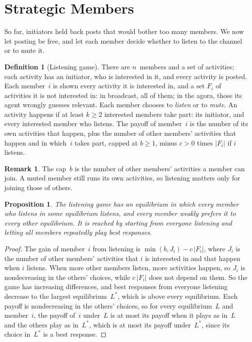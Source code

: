 \documentclass[11pt]{article}
\newtheorem{proposition}{Proposition}
\theoremstyle{definition}
\newtheorem{definition}{Definition}
\newtheorem{remark}{Remark}
\begin{document}
\section{Strategic Members}
So far, initiators held back posts that would bother too many members. We now let posting be free, and let each member decide whether to listen to the channel or to mute it.

\begin{definition}[Listening game]
There are $n$~members and a set of activities; each activity has an initiator, who is interested in it, and every activity is posted. Each member~$i$ is shown every activity it is interested in, and a set $F_i$ of activities it is not interested in: in broadcast, all of them; in the agora, those its agent wrongly guesses relevant. Each member chooses to \emph{listen} or to \emph{mute}. An activity happens if at least $k \ge 2$ interested members take part: its initiator, and every interested member who listens. The payoff of member~$i$ is the number of its own activities that happen, plus the number of other members' activities that happen and in which~$i$ takes part, capped at $b \ge 1$, minus $c > 0$ times $|F_i|$ if $i$ listens.
\end{definition}

\begin{remark}
The cap~$b$ is the number of other members' activities a member can join. A muted member still runs its own activities, so listening matters only for joining those of others.
\end{remark}

\begin{proposition}\label{prop:best}
The listening game has an equilibrium in which every member who listens in some equilibrium listens, and every member weakly prefers it to every other equilibrium. It is reached by starting from everyone listening and letting all members repeatedly play best responses.
\end{proposition}
\begin{proof}
The gain of member~$i$ from listening is $\min(b, J_i) - c\,|F_i|$, where $J_i$ is the number of other members' activities that $i$ is interested in and that happen when $i$ listens. When more other members listen, more activities happen, so $J_i$ is nondecreasing in the others' choices, while $c\,|F_i|$ does not depend on them. So the game has increasing differences, and best responses from everyone listening decrease to the largest equilibrium~$L^*$, which is above every equilibrium. Each payoff is nondecreasing in the others' choices, so for every equilibrium~$L$ and member~$i$, the payoff of~$i$ under~$L$ is at most its payoff when it plays as in~$L$ and the others play as in~$L^*$, which is at most its payoff under~$L^*$, since its choice in~$L^*$ is a best response.
\end{proof}
\end{document}
